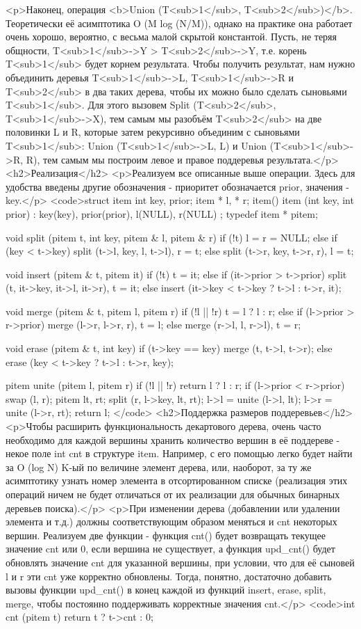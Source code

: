 <p>Наконец, операция <b>Union (T<sub>1</sub>, T<sub>2</sub>)</b>. Теоретически её асимптотика O (M log (N/M)), однако на практике она работает очень хорошо, вероятно, с весьма малой скрытой константой. Пусть, не теряя общности, T<sub>1</sub>->Y > T<sub>2</sub>->Y, т.е. корень T<sub>1</sub> будет корнем результата. Чтобы получить результат, нам нужно объединить деревья T<sub>1</sub>->L, T<sub>1</sub>->R и T<sub>2</sub> в два таких дерева, чтобы их можно было сделать сыновьями T<sub>1</sub>. Для этого вызовем Split (T<sub>2</sub>, T<sub>1</sub>->X), тем самым мы разобъём T<sub>2</sub> на две половинки L и R, которые затем рекурсивно объединим с сыновьями T<sub>1</sub>: Union (T<sub>1</sub>->L, L) и Union (T<sub>1</sub>->R, R), тем самым мы построим левое и правое поддеревья результата.</p>
<h2>Реализация</h2>
<p>Реализуем все описанные выше операции. Здесь для удобства введены другие обозначения - приоритет обозначается prior, значения - key.</p>
<code>struct item {
	int key, prior;
	item * l, * r;
	item() { }
	item (int key, int prior) : key(key), prior(prior), l(NULL), r(NULL) { }
};
typedef item * pitem;

void split (pitem t, int key, pitem & l, pitem & r) {
	if (!t)
		l = r = NULL;
	else if (key < t->key)
		split (t->l, key, l, t->l),  r = t;
	else
		split (t->r, key, t->r, r),  l = t;
}

void insert (pitem & t, pitem it) {
	if (!t)
		t = it;
	else if (it->prior > t->prior)
		split (t, it->key, it->l, it->r),  t = it;
	else
		insert (it->key < t->key ? t->l : t->r, it);
}

void merge (pitem & t, pitem l, pitem r) {
	if (!l || !r)
		t = l ? l : r;
	else if (l->prior > r->prior)
		merge (l->r, l->r, r),  t = l;
	else
		merge (r->l, l, r->l),  t = r;
}

void erase (pitem & t, int key) {
	if (t->key == key)
		merge (t, t->l, t->r);
	else
		erase (key < t->key ? t->l : t->r, key);
}

pitem unite (pitem l, pitem r) {
	if (!l || !r)  return l ? l : r;
	if (l->prior < r->prior)  swap (l, r);
	pitem lt, rt;
	split (r, l->key, lt, rt);
	l->l = unite (l->l, lt);
	l->r = unite (l->r, rt);
	return l;
}</code>
<h2>Поддержка размеров поддеревьев</h2>
<p>Чтобы расширить функциональность декартового дерева, очень часто необходимо для каждой вершины хранить количество вершин в её поддереве - некое поле int cnt в структуре item. Например, с его помощью легко будет найти за O (log N) K-ый по величине элемент дерева, или, наоборот, за ту же асимптотику узнать номер элемента в отсортированном списке (реализация этих операций ничем не будет отличаться от их реализации для обычных бинарных деревьев поиска).</p>
<p>При изменении дерева (добавлении или удалении элемента и т.д.) должны соответствующим образом меняться и cnt некоторых вершин. Реализуем две функции - функция cnt() будет возвращать текущее значение cnt или 0, если вершина не существует, а функция upd_cnt() будет обновлять значение cnt для указанной вершины, при условии, что для её сыновей l и r эти cnt уже корректно обновлены. Тогда, понятно, достаточно добавить вызовы функции upd_cnt() в конец каждой из функций insert, erase, split, merge, чтобы постоянно поддерживать корректные значения cnt.</p>
<code>int cnt (pitem t) {
	return t ? t->cnt : 0;
}

